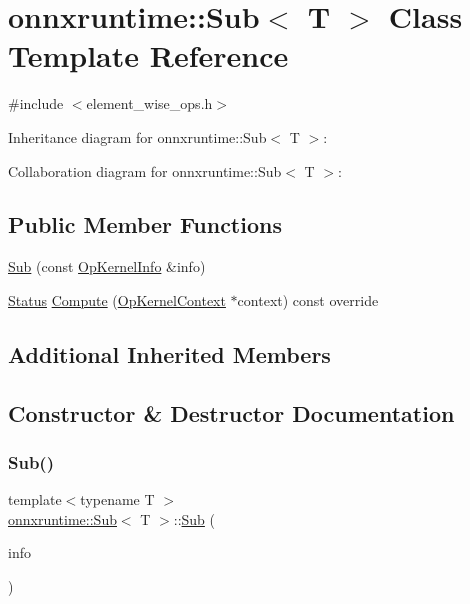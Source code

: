 \hypertarget{classonnxruntime_1_1Sub}{}\section{onnxruntime\+:\+:Sub$<$ T $>$ Class Template Reference}
\label{classonnxruntime_1_1Sub}


{\ttfamily \#include $<$element\+\_\+wise\+\_\+ops.\+h$>$}



Inheritance diagram for onnxruntime\+:\+:Sub$<$ T $>$\+:


Collaboration diagram for onnxruntime\+:\+:Sub$<$ T $>$\+:
\subsection*{Public Member Functions}
\begin{DoxyCompactItemize}
\item 
\mbox{\hyperlink{classonnxruntime_1_1Sub_a6908106e74d907a25a81dac6ae705488}{Sub}} (const \mbox{\hyperlink{classonnxruntime_1_1OpKernelInfo}{Op\+Kernel\+Info}} \&info)
\item 
\mbox{\hyperlink{classonnxruntime_1_1common_1_1Status}{Status}} \mbox{\hyperlink{classonnxruntime_1_1Sub_a86037957e3fa998cf2a5ae5b6efd6aab}{Compute}} (\mbox{\hyperlink{classonnxruntime_1_1OpKernelContext}{Op\+Kernel\+Context}} $\ast$context) const override
\end{DoxyCompactItemize}
\subsection*{Additional Inherited Members}


\subsection{Constructor \& Destructor Documentation}
\mbox{\label{classonnxruntime_1_1Sub_a6908106e74d907a25a81dac6ae705488}} 
\subsubsection{\texorpdfstring{Sub()}{Sub()}}
{\footnotesize\ttfamily template$<$typename T $>$ \\
\mbox{\hyperlink{classonnxruntime_1_1Sub}{onnxruntime\+::\+Sub}}$<$ T $>$\+::\mbox{\hyperlink{classonnxruntime_1_1Sub}{Sub}} (\begin{DoxyParamCaption}\item[{const \mbox{\hyperlink{classonnxruntime_1_1OpKernelInfo}{Op\+Kernel\+Info}} \&}]{info }\end{DoxyParamCaption})\hspace{0.3cm}{\ttfamily [inline]}}



